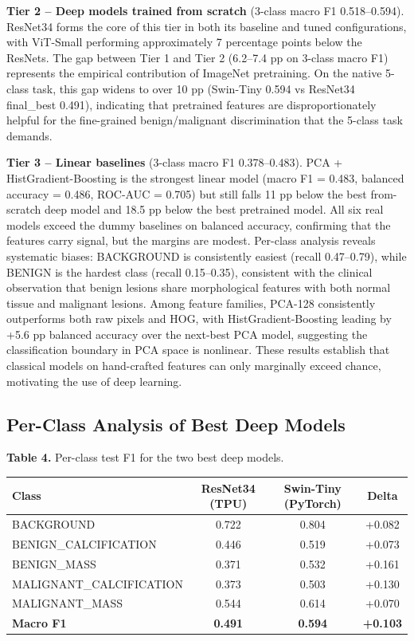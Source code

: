 \documentclass[justified,notoc,openany]{tufte-book}
\begin{document}
\textbf{Tier 2 -- Deep models trained from scratch} (3-class macro F1 0.518--0.594). ResNet34 forms the core of this tier in both its baseline and tuned configurations, with ViT-Small performing approximately 7 percentage points below the ResNets. The gap between Tier 1 and Tier 2 (6.2--7.4 pp on 3-class macro F1) represents the empirical contribution of ImageNet pretraining. On the native 5-class task, this gap widens to over 10 pp (Swin-Tiny 0.594 vs ResNet34 final\_best 0.491), indicating that pretrained features are disproportionately helpful for the fine-grained benign/malignant discrimination that the 5-class task demands.

\textbf{Tier 3 -- Linear baselines} (3-class macro F1 0.378--0.483). PCA + HistGradient-Boosting is the strongest linear model (macro F1 = 0.483, balanced accuracy = 0.486, ROC-AUC = 0.705) but still falls 11 pp below the best from-scratch deep model and 18.5 pp below the best pretrained model. All six real models exceed the dummy baselines on balanced accuracy, confirming that the features carry signal, but the margins are modest. Per-class analysis reveals systematic biases: BACKGROUND is consistently easiest (recall 0.47--0.79), while BENIGN is the hardest class (recall 0.15--0.35), consistent with the clinical observation that benign lesions share morphological features with both normal tissue and malignant lesions. Among feature families, PCA-128 consistently outperforms both raw pixels and HOG, with HistGradient-Boosting leading by +5.6 pp balanced accuracy over the next-best PCA model, suggesting the classification boundary in PCA space is nonlinear. These results establish that classical models on hand-crafted features can only marginally exceed chance, motivating the use of deep learning.

\subsection{Per-Class Analysis of Best Deep Models}\label{per-class-analysis-of-best-deep-models}

\textbf{Table 4.} Per-class test F1 for the two best deep models.

\vspace{1em}
{\centering\small
\renewcommand{\arraystretch}{1.3}
\begin{tabular}[]{@{}lccc@{}}
\toprule\noalign{}
Class & ResNet34 (TPU) & Swin-Tiny (PyTorch) & Delta \\
\midrule\noalign{}

\bottomrule\noalign{}

BACKGROUND & 0.722 & 0.804 & +0.082 \\
BENIGN\_CALCIFICATION & 0.446 & 0.519 & +0.073 \\
BENIGN\_MASS & 0.371 & 0.532 & +0.161 \\
MALIGNANT\_CALCIFICATION & 0.373 & 0.503 & +0.130 \\
MALIGNANT\_MASS & 0.544 & 0.614 & +0.070 \\
\textbf{Macro F1} & \textbf{0.491} & \textbf{0.594} & \textbf{+0.103} \\
\end{tabular}\par}
\vspace{1em}
\end{document}
